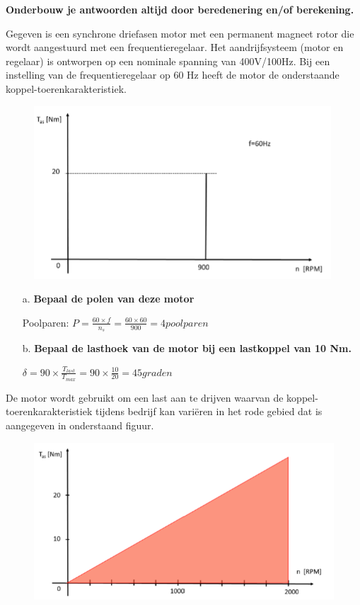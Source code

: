 \textbf{Onderbouw je antwoorden altijd door beredenering en/of berekening.}

Gegeven is een synchrone driefasen motor met een permanent magneet rotor die wordt aangestuurd met een frequentieregelaar. Het aandrijfsysteem (motor en regelaar) is ontworpen op een nominale spanning van 400V/100Hz. Bij een instelling van de frequentieregelaar op 60 Hz heeft de motor de onderstaande
koppel-toerenkarakteristiek.

\begin{figure}[h]
    \centering
    \includegraphics[scale=1.5]{3-uitleg.png}
\end{figure}

\begin{enumerate}
    \item [a.] \textbf{Bepaal de polen van deze motor}
    
        Poolparen:
        $ P = \frac{60 \times f}{n_{s}} = \frac{60 \times 60}{900} = 4 poolparen $

    \item [b.] \textbf{Bepaal de lasthoek van de motor bij een lastkoppel van 10 Nm.}
    
        $ \delta = 90 \times \frac{T_{last}}{T_{max}} = 90 \times \frac{10}{20} = 45 graden$

\end{enumerate}

De motor wordt gebruikt om een last aan te drijven waarvan de koppel-toerenkarakteristiek tijdens bedrijf kan variëren in het rode gebied dat is aangegeven in onderstaand figuur.
\begin{figure}[h]
    \centering
    \includegraphics[scale=1]{3b-uitleg.png}
\end{figure}

